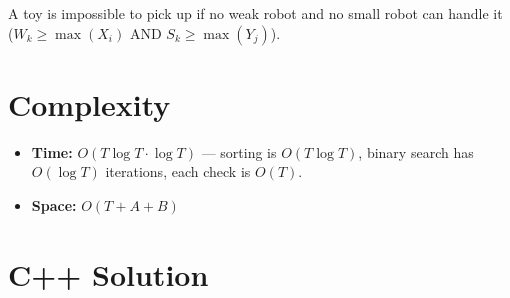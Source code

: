 \documentclass[11pt,a4paper]{article}
\begin{document}
A toy is impossible to pick up if no weak robot and no small robot can handle it ($W_k \geq \max(X_i)$ AND $S_k \geq \max(Y_j)$).

\section{Complexity}
\begin{itemize}
    \item \textbf{Time:} $O(T \log T \cdot \log T)$ --- sorting is $O(T \log T)$, binary search has $O(\log T)$ iterations, each check is $O(T)$.
    \item \textbf{Space:} $O(T + A + B)$
\end{itemize}

\section{C++ Solution}
\end{document}
